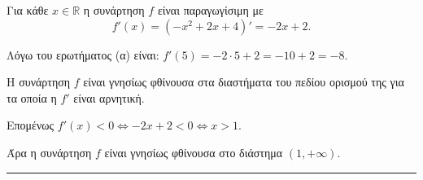 \begin{alist}
\item Για κάθε $x \in \mathbb{R}$ η συνάρτηση $f$ είναι παραγωγίσιμη με
\[ f'(x) = (-x^2 + 2x + 4)' = -2x + 2 . \]

\item Λόγω του ερωτήματος (α) είναι: $f'(5) = -2 \cdot 5 + 2 = -10 + 2 = -8$.

\item Η συνάρτηση $f$ είναι γνησίως φθίνουσα στα διαστήματα του πεδίου ορισμού της για τα οποία η $f'$ είναι αρνητική.

Επομένως $f'(x) < 0 \Leftrightarrow -2x + 2 < 0 \Leftrightarrow x > 1$.

Άρα η συνάρτηση $f$ είναι γνησίως φθίνουσα στο διάστημα $(1, +\infty)$.
\end{alist}
\vspace{6mm}
\noindent\rule{\textwidth}{0.4pt}
\vspace{6mm}

